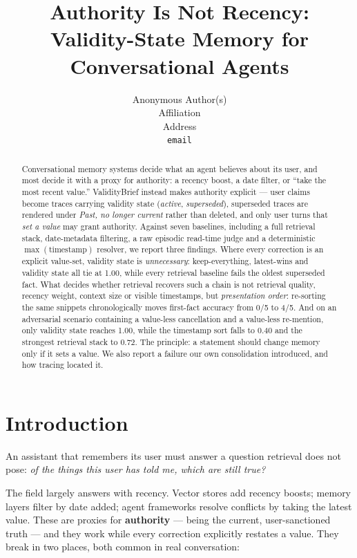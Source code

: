 \documentclass{article}
\title{Authority Is Not Recency:\\Validity-State Memory for Conversational Agents}
\author{%
  Anonymous Author(s)\\
  Affiliation\\
  Address\\
  \texttt{email}
}
\newcommand{\sysname}{ValidityBrief}
\begin{document}
\maketitle

\begin{abstract}
Conversational memory systems decide what an agent believes about its user, and most decide it with a proxy for authority: a recency boost, a date filter, or ``take the most recent value.'' \sysname{} instead makes authority explicit --- user claims become traces carrying validity state (\emph{active}, \emph{superseded}), superseded traces are rendered under \emph{Past, no longer current} rather than deleted, and only user turns that \emph{set a value} may grant authority.
Against seven baselines, including a full retrieval stack, date-metadata filtering, a raw episodic read-time judge and a deterministic $\max(\text{timestamp})$ resolver, we report three findings. Where every correction is an explicit value-set, validity state is \emph{unnecessary}: keep-everything, latest-wins and validity state all tie at 1.00, while every retrieval baseline fails the oldest superseded fact. What decides whether retrieval recovers such a chain is not retrieval quality, recency weight, context size or visible timestamps, but \emph{presentation order}: re-sorting the same snippets chronologically moves first-fact accuracy from 0/5 to 4/5. And on an adversarial scenario containing a value-less cancellation and a value-less re-mention, only validity state reaches 1.00, while the timestamp sort falls to 0.40 and the strongest retrieval stack to 0.72.
The principle: a statement should change memory only if it sets a value. We also report a failure our own consolidation introduced, and how tracing located it.
\end{abstract}

\section{Introduction}

An assistant that remembers its user must answer a question retrieval does not pose: \emph{of the things this user has told me, which are still true?}

The field largely answers with recency. Vector stores add recency boosts; memory layers filter by date added; agent frameworks resolve conflicts by taking the latest value. These are proxies for \textbf{authority} --- being the current, user-sanctioned truth --- and they work while every correction explicitly restates a value. They break in two places, both common in real conversation:
\end{document}
